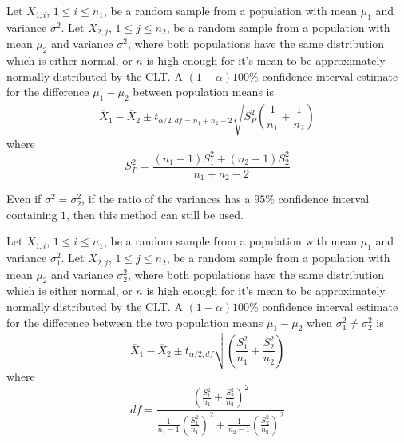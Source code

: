 \documentclass[12pt, a4paper, twoside, openright, titlepage]{book}
\begin{document}
\begin{prop}{}{}
    Let $X_{1,i}$, $1 \leq i \leq n_1$, be a random sample from a population with mean $\mu_1$ and variance $\sigma^2$. Let $X_{2,j}$, $1\leq j \leq n_2$, be a random sample from a population with mean $\mu_2$ and variance $\sigma^2$, where both populations have the same distribution which is either normal, or $n$ is high enough for it's mean to be approximately normally distributed by the CLT. A $(1-\alpha)100\%$ confidence interval estimate for the difference $\mu_1-\mu_2$ between population means is \begin{equation*}
        \overline{X}_1 -\overline{X}_2 \pm t_{\alpha/2,df = n_1+n_2 - 2}\sqrt{S_P^2\left(\frac{1}{n_1}+\frac{1}{n_2}\right)}
    \end{equation*}
    where \begin{equation*}
        S_P^2 = \frac{(n_1-1)S_1^2 + (n_2 - 1)S_2^2}{n_1+n_2-2}
    \end{equation*}
\end{prop}
    
Even if $\sigma_1^2 = \sigma_2^2$, if the ratio of the variances has a $95\%$ confidence interval containing $1$, then this method can still be used.

\begin{prop}{}{}
    Let $X_{1,i}$, $1 \leq i \leq n_1$, be a random sample from a population with mean $\mu_1$ and variance $\sigma_1^2$. Let $X_{2,j}$, $1\leq j \leq n_2$, be a random sample from a population with mean $\mu_2$ and variance $\sigma_2^2$, where both populations have the same distribution which is either normal, or $n$ is high enough for it's mean to be approximately normally distributed by the CLT. A $(1-\alpha)100\%$ confidence interval estimate for the difference between the two population means $\mu_1 - \mu_2$ when $\sigma_1^2 \neq \sigma_2^2$ is \begin{equation*}
        \overline{X}_1 - \overline{X}_2 \pm t_{\alpha/2,df}\sqrt{\left(\frac{S_1^2}{n_1} + \frac{S_2^2}{n_2}\right)}
    \end{equation*}
    where \begin{equation*}
        df = \frac{\left(\frac{S_1^2}{n_1} + \frac{S_2^2}{n_2}\right)^2}{\frac{1}{n_1-1}\left(\frac{S_1^2}{n_1}\right)^2+\frac{1}{n_2-1}\left(\frac{S_2^2}{n_2}\right)^2}
    \end{equation*}
\end{prop}
\end{document}
